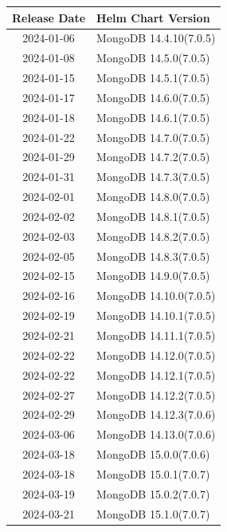 \documentclass[../main.tex]{subfiles}
\begin{document}
\begin{table}[h]
\centering
\begin{minipage}{0.45\textwidth}
\centering
\begin{tabular}{|c|l|}
\hline
\textbf{Release Date} & \textbf{Helm Chart Version} \\ \hline
    2024-01-06 & MongoDB 14.4.10(7.0.5) \\ \hline   
    2024-01-08 & MongoDB 14.5.0(7.0.5) \\ \hline   
    2024-01-15 & MongoDB 14.5.1(7.0.5) \\ \hline  
    2024-01-17 & MongoDB 14.6.0(7.0.5) \\ \hline  
    2024-01-18 & MongoDB 14.6.1(7.0.5) \\ \hline  
    2024-01-22 & MongoDB 14.7.0(7.0.5) \\ \hline  
    2024-01-29 & MongoDB 14.7.2(7.0.5) \\ \hline  
    2024-01-31 & MongoDB 14.7.3(7.0.5) \\ \hline
    2024-02-01 & MongoDB 14.8.0(7.0.5) \\ \hline  
    2024-02-02 & MongoDB 14.8.1(7.0.5) \\ \hline  
    2024-02-03 & MongoDB 14.8.2(7.0.5) \\ \hline  
    2024-02-05 & MongoDB 14.8.3(7.0.5) \\ \hline  
    2024-02-15 & MongoDB 14.9.0(7.0.5) \\ \hline  
    2024-02-16 & MongoDB 14.10.0(7.0.5) \\ \hline
    2024-02-19 & MongoDB 14.10.1(7.0.5) \\ \hline  
    2024-02-21 & MongoDB 14.11.1(7.0.5) \\ \hline  
    2024-02-22 & MongoDB 14.12.0(7.0.5) \\ \hline  
    2024-02-22 & MongoDB 14.12.1(7.0.5) \\ \hline  
    2024-02-27 & MongoDB 14.12.2(7.0.5) \\ \hline  
    2024-02-29 & MongoDB 14.12.3(7.0.6) \\ \hline  
    2024-03-06 & MongoDB 14.13.0(7.0.6) \\ \hline
    2024-03-18 & MongoDB 15.0.0(7.0.6) \\ \hline  
    2024-03-18 & MongoDB 15.0.1(7.0.7) \\ \hline
    2024-03-19 & MongoDB 15.0.2(7.0.7) \\ \hline 
    2024-03-21 & MongoDB 15.1.0(7.0.7) \\ \hline 

\end{tabular}
\end{minipage}
\end{table}
\end{document}
